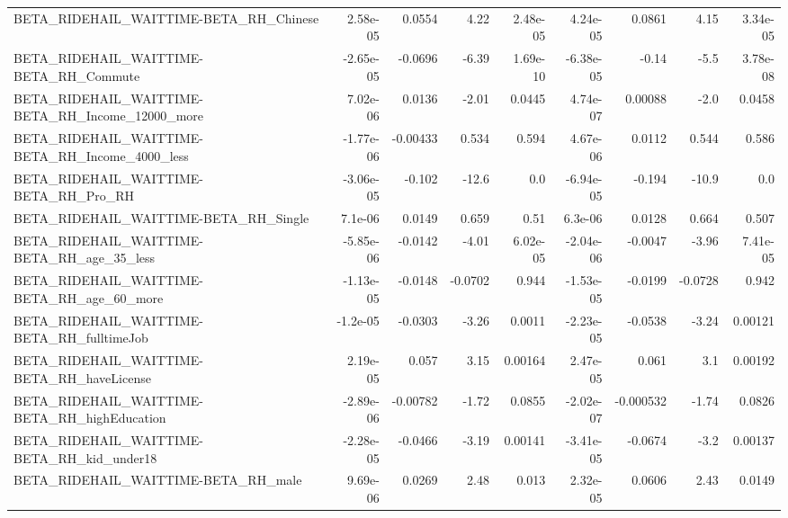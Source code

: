 \begin{tabular}{lrrrrrrrr}
BETA\_RIDEHAIL\_WAITTIME-BETA\_RH\_Chinese             &    2.58e-05 &       0.0554 &      4.22 & 2.48e-05 &   4.24e-05 &      0.0861 &         4.15 &      3.34e-05 \\
BETA\_RIDEHAIL\_WAITTIME-BETA\_RH\_Commute             &   -2.65e-05 &      -0.0696 &     -6.39 & 1.69e-10 &  -6.38e-05 &       -0.14 &         -5.5 &      3.78e-08 \\
BETA\_RIDEHAIL\_WAITTIME-BETA\_RH\_Income\_12000\_more   &    7.02e-06 &       0.0136 &     -2.01 &   0.0445 &   4.74e-07 &     0.00088 &         -2.0 &        0.0458 \\
BETA\_RIDEHAIL\_WAITTIME-BETA\_RH\_Income\_4000\_less    &   -1.77e-06 &     -0.00433 &     0.534 &    0.594 &   4.67e-06 &      0.0112 &        0.544 &         0.586 \\
BETA\_RIDEHAIL\_WAITTIME-BETA\_RH\_Pro\_RH              &   -3.06e-05 &       -0.102 &     -12.6 &      0.0 &  -6.94e-05 &      -0.194 &        -10.9 &           0.0 \\
BETA\_RIDEHAIL\_WAITTIME-BETA\_RH\_Single              &     7.1e-06 &       0.0149 &     0.659 &     0.51 &    6.3e-06 &      0.0128 &        0.664 &         0.507 \\
BETA\_RIDEHAIL\_WAITTIME-BETA\_RH\_age\_35\_less         &   -5.85e-06 &      -0.0142 &     -4.01 & 6.02e-05 &  -2.04e-06 &     -0.0047 &        -3.96 &      7.41e-05 \\
BETA\_RIDEHAIL\_WAITTIME-BETA\_RH\_age\_60\_more         &   -1.13e-05 &      -0.0148 &   -0.0702 &    0.944 &  -1.53e-05 &     -0.0199 &      -0.0728 &         0.942 \\
BETA\_RIDEHAIL\_WAITTIME-BETA\_RH\_fulltimeJob         &    -1.2e-05 &      -0.0303 &     -3.26 &   0.0011 &  -2.23e-05 &     -0.0538 &        -3.24 &       0.00121 \\
BETA\_RIDEHAIL\_WAITTIME-BETA\_RH\_haveLicense         &    2.19e-05 &        0.057 &      3.15 &  0.00164 &   2.47e-05 &       0.061 &          3.1 &       0.00192 \\
BETA\_RIDEHAIL\_WAITTIME-BETA\_RH\_highEducation       &   -2.89e-06 &     -0.00782 &     -1.72 &   0.0855 &  -2.02e-07 &   -0.000532 &        -1.74 &        0.0826 \\
BETA\_RIDEHAIL\_WAITTIME-BETA\_RH\_kid\_under18         &   -2.28e-05 &      -0.0466 &     -3.19 &  0.00141 &  -3.41e-05 &     -0.0674 &         -3.2 &       0.00137 \\
BETA\_RIDEHAIL\_WAITTIME-BETA\_RH\_male                &    9.69e-06 &       0.0269 &      2.48 &    0.013 &   2.32e-05 &      0.0606 &         2.43 &        0.0149 \\

\end{tabular}
